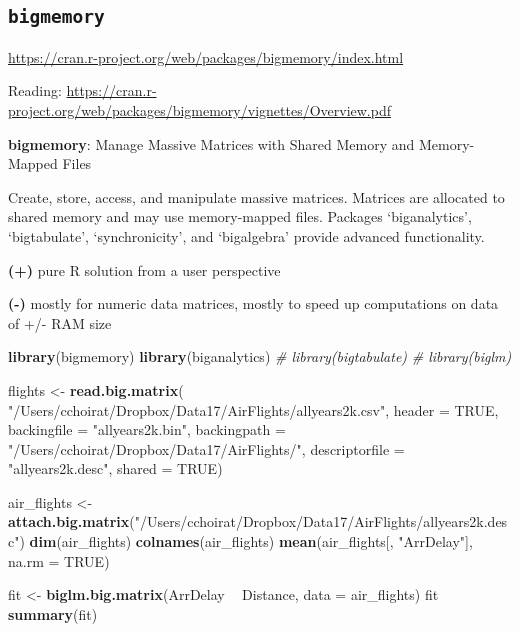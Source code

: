 \documentclass[]{book}
\newenvironment{Shaded}{\begin{snugshade}}{\end{snugshade}}
\newcommand{\KeywordTok}[1]{\textcolor[rgb]{0.13,0.29,0.53}{\textbf{#1}}}
\newcommand{\DataTypeTok}[1]{\textcolor[rgb]{0.13,0.29,0.53}{#1}}
\newcommand{\StringTok}[1]{\textcolor[rgb]{0.31,0.60,0.02}{#1}}
\newcommand{\CommentTok}[1]{\textcolor[rgb]{0.56,0.35,0.01}{\textit{#1}}}
\newcommand{\OtherTok}[1]{\textcolor[rgb]{0.56,0.35,0.01}{#1}}
\newcommand{\OperatorTok}[1]{\textcolor[rgb]{0.81,0.36,0.00}{\textbf{#1}}}
\newcommand{\NormalTok}[1]{#1}
\theoremstyle{definition}
\theoremstyle{definition}
\theoremstyle{definition}
\theoremstyle{remark}
\begin{document}
\subsection{\texorpdfstring{\texttt{bigmemory}}{bigmemory}}\label{bigmemory}

\url{https://cran.r-project.org/web/packages/bigmemory/index.html}

Reading:
\url{https://cran.r-project.org/web/packages/bigmemory/vignettes/Overview.pdf}

\textbf{bigmemory}: Manage Massive Matrices with Shared Memory and
Memory-Mapped Files

Create, store, access, and manipulate massive matrices. Matrices are
allocated to shared memory and may use memory-mapped files. Packages
`biganalytics', `bigtabulate', `synchronicity', and `bigalgebra' provide
advanced functionality.

\textbf{(+)} pure R solution from a user perspective

\textbf{(-)} mostly for numeric data matrices, mostly to speed up
computations on data of +/- RAM size

\begin{Shaded}
\begin{Highlighting}[]
\KeywordTok{library}\NormalTok{(bigmemory)}
\KeywordTok{library}\NormalTok{(biganalytics)}
\CommentTok{# library(bigtabulate)}
\CommentTok{# library(biglm)}

\NormalTok{flights <-}\StringTok{ }\KeywordTok{read.big.matrix}\NormalTok{(}
  \StringTok{"/Users/cchoirat/Dropbox/Data17/AirFlights/allyears2k.csv"}\NormalTok{,}
  \DataTypeTok{header =} \OtherTok{TRUE}\NormalTok{,}
  \DataTypeTok{backingfile =} \StringTok{"allyears2k.bin"}\NormalTok{,}
  \DataTypeTok{backingpath =} \StringTok{"/Users/cchoirat/Dropbox/Data17/AirFlights/"}\NormalTok{,}
  \DataTypeTok{descriptorfile =} \StringTok{"allyears2k.desc"}\NormalTok{,}
  \DataTypeTok{shared =} \OtherTok{TRUE}\NormalTok{)}

\NormalTok{air_flights <-}\StringTok{ }\KeywordTok{attach.big.matrix}\NormalTok{(}\StringTok{"/Users/cchoirat/Dropbox/Data17/AirFlights/allyears2k.desc"}\NormalTok{)}
\KeywordTok{dim}\NormalTok{(air_flights)}
\KeywordTok{colnames}\NormalTok{(air_flights)}
\KeywordTok{mean}\NormalTok{(air_flights[, }\StringTok{"ArrDelay"}\NormalTok{], }\DataTypeTok{na.rm =} \OtherTok{TRUE}\NormalTok{)}

\NormalTok{fit <-}\StringTok{ }\KeywordTok{biglm.big.matrix}\NormalTok{(ArrDelay }\OperatorTok{~}\StringTok{ }\NormalTok{Distance, }\DataTypeTok{data =}\NormalTok{ air_flights)}
\NormalTok{fit}
\KeywordTok{summary}\NormalTok{(fit)}
\end{Highlighting}
\end{Shaded}
\end{document}
